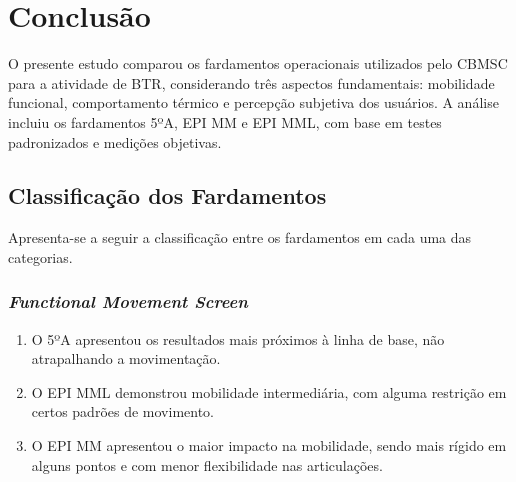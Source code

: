 \chapter{Conclusão}
    O presente estudo comparou os fardamentos operacionais utilizados pelo \acrshort{CBMSC} para a 
    atividade de \acrlong{BTR}, considerando três aspectos fundamentais: mobilidade funcional, 
    comportamento térmico e percepção subjetiva dos usuários. A análise incluiu os fardamentos 5ºA, 
    EPI \acrlong{MM} e EPI \acrlong{MML}, com base em testes padronizados e medições objetivas.
    
    \section{Classificação dos Fardamentos}
        Apresenta-se a seguir a classificação entre os fardamentos em cada uma das categorias.
        \subsection{\textit{Functional Movement Screen}}
            \begin{enumerate}[label=\Roman*.] %
                \item O 5ºA apresentou os resultados mais próximos à linha de base, não atrapalhando a 
                movimentação.
                \item O \acrshort{EPI} \acrlong{MML} demonstrou mobilidade intermediária, com alguma
                restrição em certos padrões de movimento.
                \item O \acrshort{EPI} \acrlong{MM} apresentou o maior impacto na mobilidade, sendo 
                mais rígido em alguns pontos e com menor flexibilidade nas articulações.
                \end{enumerate}

